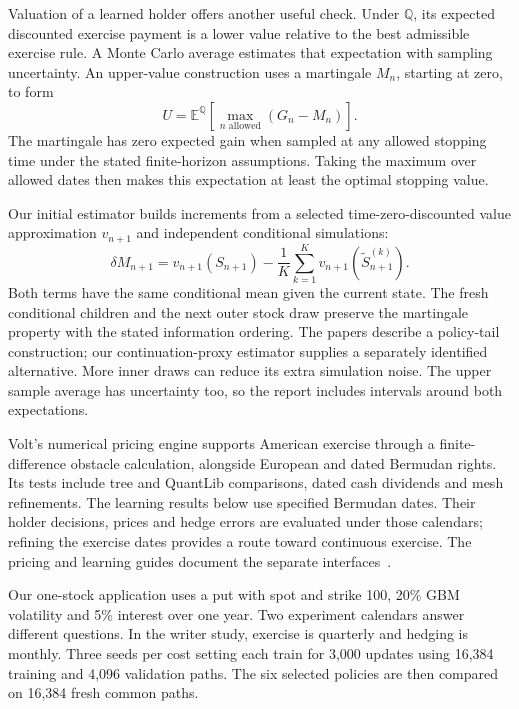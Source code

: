\documentclass[8pt]{strategynet-journal}
\newcommand{\E}{\mathbb{E}}
\newcommand{\Q}{\mathbb{Q}}
\begin{document}
\begin{SNcolumns}
Valuation of a learned holder offers another useful check. Under $\Q$, its
expected discounted exercise payment is a lower value relative to the best
admissible exercise rule. A Monte Carlo average estimates that expectation
with sampling uncertainty. An upper-value construction uses a martingale
$M_n$, starting at zero, to form
\[
 U=\E^{\Q}\!\left[\max_{n\text{ allowed}}(G_n-M_n)\right].
\]
The martingale has zero expected gain when sampled at any allowed stopping
time under the stated finite-horizon assumptions. Taking the maximum over
allowed dates then makes this expectation at least the optimal stopping value.

Our initial estimator builds increments from a selected time-zero-discounted
value approximation
$v_{n+1}$ and independent conditional simulations:
\[
 \delta M_{n+1}=v_{n+1}(S_{n+1})-
     \frac1K\sum_{k=1}^{K}v_{n+1}(\widetilde S_{n+1}^{(k)}).
\]
Both terms have the same conditional mean given the current state. The fresh
conditional children and the next outer stock draw preserve the martingale
property with the stated information ordering. The papers describe a
policy-tail construction; our continuation-proxy estimator supplies a
separately identified alternative. More inner draws can reduce its extra
simulation noise. The upper sample average has uncertainty too, so the
report includes intervals around both expectations.

Volt's numerical pricing engine supports American exercise through a
finite-difference obstacle calculation, alongside European and dated Bermudan
rights. Its tests include tree and QuantLib comparisons, dated cash dividends
and mesh refinements. The learning results below use specified Bermudan dates.
Their holder decisions, prices and hedge errors are evaluated under those
calendars; refining the exercise dates provides a route toward continuous
exercise. The pricing and learning guides document the separate
interfaces~\cite{voltapi}.

Our one-stock application uses a put with spot and strike 100, 20\% GBM
volatility and 5\% interest over one year. Two experiment calendars answer
different questions. In the writer study, exercise is quarterly and hedging
is monthly. Three seeds per cost setting each train for 3,000 updates using
16,384 training and 4,096 validation paths. The six selected policies are
then compared on 16,384 fresh common paths.


\end{SNcolumns}
\end{document}

